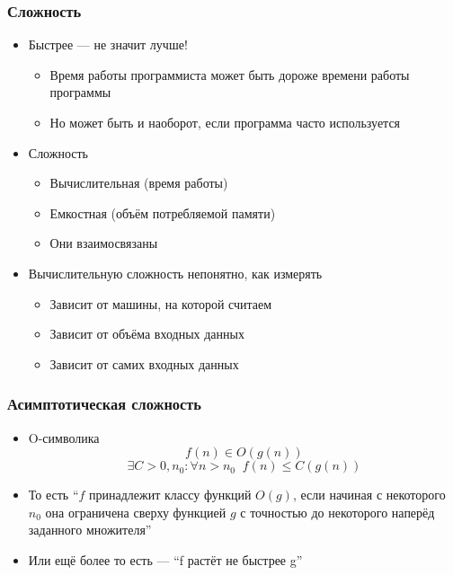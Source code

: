 \documentclass{../../slides-style}
\begin{document}
    
    \begin{frame}[plain]
        \titlepage
    \end{frame}
    
    \begin{frame}
        \frametitle{Сложность}
        \begin{itemize}
            \item Быстрее --- не значит лучше!
            \begin{itemize}
                \item Время работы программиста может быть дороже времени работы программы
                \item Но может быть и наоборот, если программа часто используется
            \end{itemize}
            \item Сложность
            \begin{itemize}
                \item Вычислительная (время работы)
                \item Емкостная (объём потребляемой памяти)
                \item Они взаимосвязаны
            \end{itemize}
            \item Вычислительную сложность непонятно, как измерять
            \begin{itemize}
                \item Зависит от машины, на которой считаем
                \item Зависит от объёма входных данных
                \item Зависит от самих входных данных
            \end{itemize}
        \end{itemize}
    \end{frame}

    \begin{frame}
        \frametitle{Асимптотическая сложность}
        \begin{itemize}
            \item O-символика
            $$f(n) \in O(g(n))$$
            $$\exists C > 0, n_0 : \forall n > n_0\;\; f(n) \leq C(g(n))$$
            \item То есть ``$f$ принадлежит классу функций $O(g)$, если начиная с некоторого $n_0$ она ограничена сверху функцией $g$ с точностью до некоторого наперёд заданного множителя''
            \item Или ещё более то есть --- ``f растёт не быстрее g''
        \end{itemize}
    \end{frame}
\end{document}
